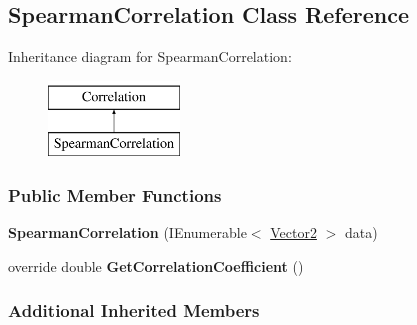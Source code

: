 \hypertarget{classDataTools_1_1correlation_1_1SpearmanCorrelation}{}\subsection{Spearman\+Correlation Class Reference}
\label{classDataTools_1_1correlation_1_1SpearmanCorrelation}
Inheritance diagram for Spearman\+Correlation\+:\begin{figure}[H]
\begin{center}
\leavevmode
\includegraphics[height=2.000000cm]{classDataTools_1_1correlation_1_1SpearmanCorrelation}
\end{center}
\end{figure}
\subsubsection*{Public Member Functions}
\begin{DoxyCompactItemize}
\item 
\mbox{\label{classDataTools_1_1correlation_1_1SpearmanCorrelation_a57c5b09341d60a6a06276a9a913474ba}} 
{\bfseries Spearman\+Correlation} (I\+Enumerable$<$ \hyperlink{classDataTools_1_1Vector2}{Vector2} $>$ data)
\item 
\mbox{\label{classDataTools_1_1correlation_1_1SpearmanCorrelation_afff258bf05afa59c8fd4118e650e1682}} 
override double {\bfseries Get\+Correlation\+Coefficient} ()
\end{DoxyCompactItemize}
\subsubsection*{Additional Inherited Members}

